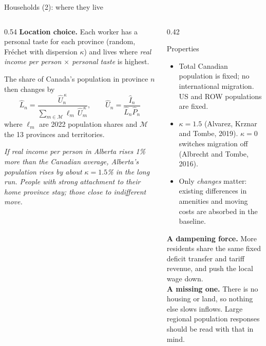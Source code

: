 \documentclass[aspectratio=169,9pt,t]{beamer}
\newcommand{\h}[1]{\hat{#1}}
\newcommand{\plain}[1]{{\color{ipgrey}\small\itshape #1}}
\begin{document}
\begin{frame}{Households (2): where they live}
  \begin{columns}[T]
    \begin{column}{0.54\textwidth}
      \textbf{Location choice.} Each worker has a personal taste for each
      province (random, Fr\'echet with dispersion $\kappa$) and lives where
      \emph{real income per person $\times$ personal taste} is highest.

      \medskip
      The share of Canada's population in province $n$ then changes by
      \[ \h L_n=\frac{\h U_n^{\,\kappa}}{\sum_{m\in\mathcal M}\ell_m\,\h U_m^{\,\kappa}},
         \qquad \h U_n=\frac{\h I_n}{\h L_n\h P_n} \]
      where $\ell_m$ are 2022 population shares and $\mathcal M$ the 13
      provinces and territories.

      \medskip
      \plain{If real income per person in Alberta rises 1\% more than the
      Canadian average, Alberta's population rises by about
      $\kappa=1.5$\% in the long run. People with strong attachment to
      their home province stay; those close to indifferent move.}
    \end{column}
    \begin{column}{0.42\textwidth}
      \begin{block}{Properties}
        \small
        \begin{itemize}
          \item Total Canadian population is fixed; no international
                migration. US and ROW populations are fixed.
          \item $\kappa=1.5$ (Alvarez, Krznar and Tombe, 2019).
                $\kappa=0$ switches migration off (Albrecht and Tombe,
                2016).
          \item Only \emph{changes} matter: existing differences in
                amenities and moving costs are absorbed in the baseline.
        \end{itemize}
      \end{block}
      \small
      \textbf{A dampening force.} More residents share the same fixed
      deficit transfer and tariff revenue, and push the local wage down.\\[0.3em]
      \textbf{A missing one.} There is no housing or land, so nothing
      else slows inflows. Large regional population responses should be
      read with that in mind.
    \end{column}
  \end{columns}
\end{frame}
\end{document}
